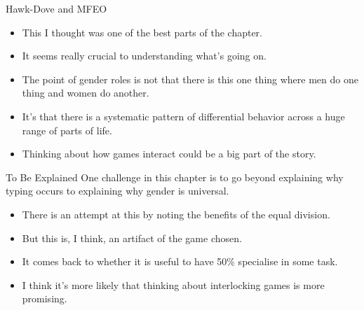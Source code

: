 \documentclass[
  ignorenonframetext,
]{beamer}
\providecommand{\tightlist}{%
  \setlength{\itemsep}{0pt}\setlength{\parskip}{0pt}}
\begin{document}
\begin{frame}{Hawk-Dove and MFEO}
\protect\hypertarget{hawk-dove-and-mfeo}{}
\begin{itemize}
\tightlist
\item
  This I thought was one of the best parts of the chapter.
\item
  It seems really crucial to understanding what's going on.
\item
  The point of gender roles is not that there is this one thing where
  men do one thing and women do another.
\item
  It's that there is a systematic pattern of differential behavior
  across a huge range of parts of life.
\item
  Thinking about how games interact could be a big part of the story.
\end{itemize}
\end{frame}

\begin{frame}{To Be Explained}
\protect\hypertarget{to-be-explained}{}
One challenge in this chapter is to go beyond explaining why typing
occurs to explaining why gender is universal.

\begin{itemize}
\tightlist
\item
  There is an attempt at this by noting the benefits of the equal
  division.
\item
  But this is, I think, an artifact of the game chosen.
\item
  It comes back to whether it is useful to have 50\% specialise in some
  task.
\item
  I think it's more likely that thinking about interlocking games is
  more promising.
\end{itemize}
\end{frame}
\end{document}
